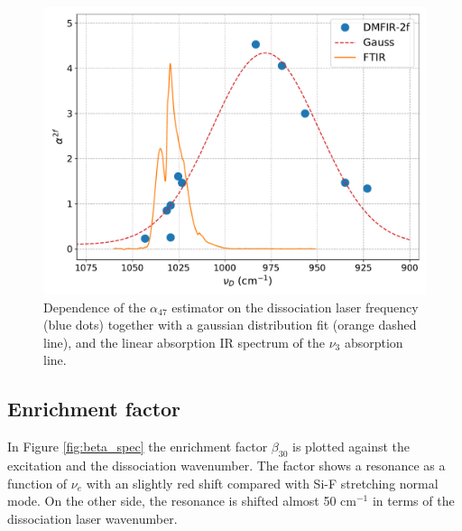 \documentclass[global,twocolumn]{svjour}
\begin{document}
\begin{figure}[h]
	\centering
	\includegraphics[width = 1\linewidth]{figures/alfa_47_nu_diso.pdf}
	\caption{\label{fig:alfa_nu_diso} Dependence of the $\alpha_{47}$ estimator on the dissociation laser frequency (blue dots) together with a gaussian distribution fit (orange dashed line), and the linear absorption IR spectrum of the $\nu_{3}$ absorption line.}
\end{figure}

\subsection{Enrichment factor}
In Figure \ref{fig:beta_spec} the enrichment factor $\beta_{30}$ is plotted against the excitation and the dissociation wavenumber. The factor shows a resonance as a function of $\nu_{e}$ with an slightly red shift compared with Si-F stretching normal mode. On the other side, the resonance is shifted almost 50 cm$^{-1}$ in terms of the dissociation laser wavenumber. 
\end{document}
